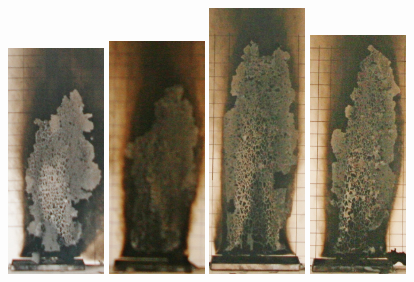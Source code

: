 \documentclass[twoside]{uocthesis}
\begin{document}
{\begin{figure}[p]
	\includegraphics[width=1.0in]{../Figures/GBGAS_02_IMG_5554}
	\includegraphics[width=1.0in]{../Figures/GBGAS_05_IMG_5635}
	\includegraphics[width=1.0in]{../Figures/GBGAS_06_IMG_5661}
	\includegraphics[width=1.0in]{../Figures/GBGAS_07_IMG_5679}

\end{figure}}
\end{document}
